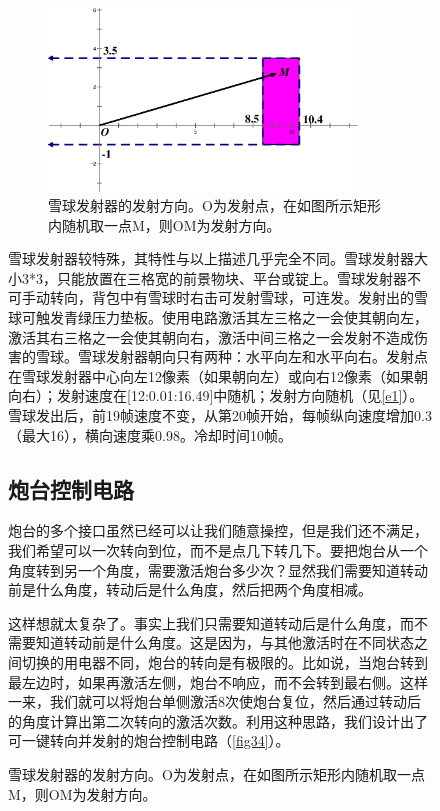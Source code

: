 \begin{figure}[!ht]
\begin{figure}[!ht]
\centering
\includegraphics[width=0.9\textwidth]{images/1.eps}
\caption{雪球发射器的发射方向。O为发射点，在如图所示矩形内随机取一点M，则OM为发射方向。}\label{e1}
\end{figure}
雪球发射器较特殊，其特性与以上描述几乎完全不同。雪球发射器大小3*3，只能放置在三格宽的前景物块、平台或锭上。雪球发射器不可手动转向，背包中有雪球时右击可发射雪球，可连发。发射出的雪球可触发青绿压力垫板。使用电路激活其左三格之一会使其朝向左，激活其右三格之一会使其朝向右，激活中间三格之一会发射不造成伤害的雪球。雪球发射器朝向只有两种：水平向左和水平向右。发射点在雪球发射器中心向左12像素（如果朝向左）或向右12像素（如果朝向右）；发射速度在[12:0.01:16.49]中随机；发射方向随机（见\autoref{e1}）。雪球发出后，前19帧速度不变，从第20帧开始，每帧纵向速度增加0.3（最大16），横向速度乘0.98。冷却时间10帧。

\subsection{炮台控制电路}
炮台的多个接口虽然已经可以让我们随意操控，但是我们还不满足，我们希望可以一次转向到位，而不是点几下转几下。要把炮台从一个角度转到另一个角度，需要激活炮台多少次？显然我们需要知道转动前是什么角度，转动后是什么角度，然后把两个角度相减。

这样想就太复杂了。事实上我们只需要知道转动后是什么角度，而不需要知道转动前是什么角度。这是因为，与其他激活时在不同状态之间切换的用电器不同，炮台的转向是有极限的。比如说，当炮台转到最左边时，如果再激活左侧，炮台不响应，而不会转到最右侧。这样一来，我们就可以将炮台单侧激活8次使炮台复位，然后通过转动后的角度计算出第二次转向的激活次数。利用这种思路，我们设计出了可一键转向并发射的炮台控制电路（\autoref{fig34}）。


\end{figure}
